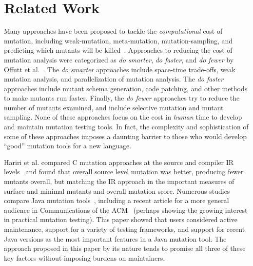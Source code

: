 \documentclass[sigconf,review, anonymous]{acmart}
\begin{document}
{\section{Related Work}

Many approaches have been proposed to tackle the \emph{computational} cost of mutation, including weak-mutation, 
meta-mutation, mutation-sampling, and predicting which mutants will be
killed~\cite{offuttMutant1996,
  untch1993mutation,KaufmanFAKAJ2022,zhang2016pmt}.  Approaches to reducing the cost of
mutation analysis were categorized as \textit{do smarter}, \textit{do
faster}, and \textit{do fewer} by Offutt et al.~\cite{offutt2001mutation}.
The \textit{do smarter} approaches include space-time trade-offs, weak
mutation analysis, and parallelization of mutation analysis. The \textit{do
faster} approaches include mutant schema generation, code patching, and
other methods to make mutants run faster. Finally, the
\textit{do fewer} approaches try to reduce the number of mutants examined,
and include selective mutation and mutant sampling.
None of these approaches focus on the cost in \emph{human} time to
develop and maintain mutation testing tools.  In fact, the complexity
and sophistication of some of these approaches imposes a daunting
barrier to those who would develop ``good'' mutation tools for a new
language.

Hariri et al. compared C mutation approaches at the source and
compiler IR levels~\cite{CompareSrcBinary} and found that overall
source level mutation was better, producing fewer mutants overall, but
matching the IR approach in the important measures of surface and
minimal mutants and overall mutation score.  Numerous studies compare
Java mutation tools~\cite{MajorPIT,gopinath2017does}, including a
recent article for a more general audience in Communications of the
ACM~\cite{CommACMJavaTool} (perhaps showing the growing interest in
practical mutation testing).  This paper showed that users
considered active maintenance, support for a variety of testing
frameworks, and support for recent Java versions as the most important
features in a Java mutation tool.  The approach proposed in this paper
by its nature tends to promise all three of these key factors without
imposing burdens on maintainers.

}
\end{document}
